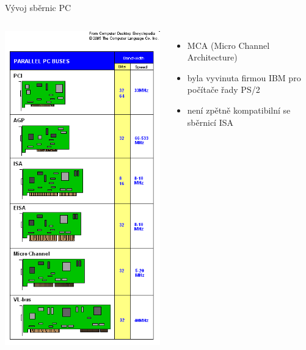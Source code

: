 \documentclass[aspectratio=43]{beamer}
\begin{document}
\begin{frame}{Vývoj sběrnic PC}
	
	\begin{columns}
		\includegraphics[width=0.85\linewidth]{extrahovane_obrazky/img_1_page6_0.png}
		\begin{itemize}
			\item MCA (Micro Channel Architecture)
			\item byla vyvinuta firmou IBM pro počítače řady PS/2
			\item není zpětně kompatibilní se sběrnicí ISA

\end{itemize}
\end{columns}
\end{frame}
\end{document}
